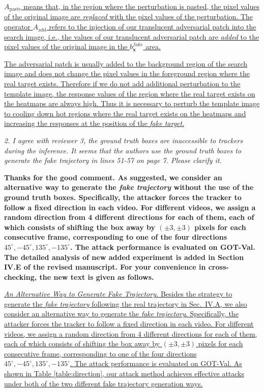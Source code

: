 \documentclass[12pt]{article}
\newcommand{\ie}{i.e.}
\begin{document}
\uline{
$A_{\text{paste}}$ means that, in the region where the perturbation is pasted, the pixel values of the original image are \textit{replaced} with the pixel values of the perturbation.
The operator $A_\text{add}$ refers to the injection of our translucent adversarial patch into the search image, \ie, the values of our translucent adversarial patch are \textit{added} to the pixel values of the original image in the $b^{fake}_{\textbf{x}}$ area.}

\uline{
The adversarial patch is usually added to the background region of the search image and does not change the pixel values in the foreground region where the real target exists. Therefore if we do not add additional perturbation to the template image, the response values of the region where the real target exists on the heatmaps are always high. Thus it is necessary to perturb the template image to cooling down hot regions where the real target exists on the heatmaps and increasing the responses at the position of the \textit{fake target}.
}


\textit{2. I agree with reviewer 3, the ground truth boxes are inaccessible to trackers during the inference. It seems that the authors use the ground truth boxes to generate the fake trajectory in lines 51-57 on page 7. Please clarify it.}

\textbf{
Thanks for the good comment. As suggested, we consider an alternative way to generate the \textit{fake trajectory} without the use of the ground truth boxes.
Specifically, the attacker forces the tracker to follow a fixed direction in each video. For different videos, we assign a random direction from 4 different directions for each of them, each of which consists of shifting the box away by $(\pm 3, \pm 3)$ pixels for each consecutive frame, corresponding to one of the four directions $45^{\circ}, -45^{\circ}, 135^{\circ}, -135^{\circ}$. The attack performance is evaluated on GOT-Val.
The detailed analysis of new added experiment is added in Section IV.E of the revised manuscript. For your convenience in cross-checking, the new text is given as follows.}

\uline{\textit{An Alternative Way to Generate Fake Trajectory.}  Besides the strategy to generate the \textit{fake trajectory} following the real trajectory in Sec.~IV.A, we also consider an alternative way to generate the \textit{fake trajectory}.
Specifically, the attacker forces the tracker to follow a fixed direction in each video. For different videos, we assign a random direction from 4 different directions for each of them, each of which consists of shifting the box away by $(\pm 3, \pm 3)$ pixels for each consecutive frame, corresponding to one of the four directions $45^{\circ}, -45^{\circ}, 135^{\circ}, -135^{\circ}$. The attack performance is evaluated on GOT-Val. As shown in Table \ref{table:direction}, our attack method achieves effective attacks under both of the two different fake trajectory generation ways.}
\end{document}
